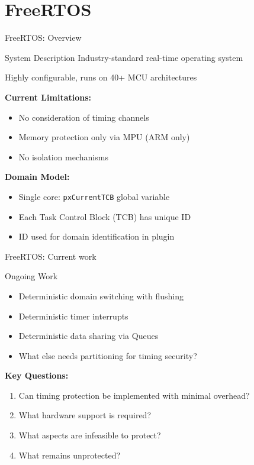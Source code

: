 \section{FreeRTOS}

\begin{frame}{FreeRTOS: Overview}
	\begin{block}{System Description}
		Industry-standard real-time operating system

		Highly configurable, runs on 40+ MCU architectures
	\end{block}

	\vspace{0.3cm}

	\textbf{Current Limitations:}
	\begin{itemize}
		\item No consideration of timing channels
		\item Memory protection only via MPU (ARM only)
		\item No isolation mechanisms
	\end{itemize}

	\vspace{0.3cm}
  \pause

	\textbf{Domain Model:}
	\begin{itemize}
		\item Single core: \texttt{pxCurrentTCB} global variable
		\item Each Task Control Block (TCB) has unique ID
		\item ID used for domain identification in plugin
	\end{itemize}
\end{frame}

\begin{frame}{FreeRTOS: Current work}
	\begin{block}{Ongoing Work}
		\begin{itemize}
			\item[$\square$] Deterministic domain switching with flushing
			\item[$\square$] Deterministic timer interrupts
			\item[$\square$] Deterministic data sharing via Queues
			\item[$\square$] What else needs partitioning for timing security?
		\end{itemize}
	\end{block}

	\vspace{0.5cm}
  \pause

	\textbf{Key Questions:}
	\begin{enumerate}
		\item Can timing protection be implemented with minimal overhead?
		\item What hardware support is required?
		\item What aspects are infeasible to protect?
		\item What remains unprotected?
	\end{enumerate}
\end{frame}
